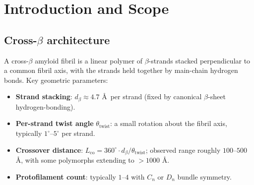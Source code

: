 \documentclass[12pt]{article}
\begin{document}
\begin{abstract}
\textbf{Empirical conjecture and falsifier.} The central prediction
(Conjecture~\ref{conj:C1}) is that observed cross-$\beta$ fibril
per-strand twists cluster on this 24-element admissible set
rather than distributing uniformly over $[3.4^{\circ}, 16.4^{\circ}]$.
Ultra-slow-twist polymorphs ($\theta < 3.4^{\circ}$, e.g.\ tau PHF
$\sim 1^{\circ}$) lie outside the current filter and are flagged
as an open regime (Remark~\ref{rem:R2}). The empirical test is
pending curation of a cryo-EM amyloid-twist dataset.

No empirical comparison is carried out in this paper; the
comparison pipeline follows the WO-1 capsid
template~\cite{SmartCapsid} with \texttt{wo2\_amyloid\_fetch.py}
and \texttt{wo2\_compare.py} planned in the same
\texttt{WAITING\_FOR\_DATA} style. Every claim is classified as
\textbf{derived}, \textbf{identified}, or \textbf{open}.
\end{abstract}

\section{Introduction and Scope}\label{sec:intro}

\subsection{Cross-$\beta$ architecture}

A cross-$\beta$ amyloid fibril is a linear polymer of
$\beta$-strands stacked perpendicular to a common fibril axis,
with the strands held together by main-chain hydrogen bonds. Key
geometric parameters:

\begin{itemize}
\item \textbf{Strand stacking}: $d_\beta \approx 4.7$ \AA\ per
  strand (fixed by canonical $\beta$-sheet hydrogen-bonding).
\item \textbf{Per-strand twist angle} $\theta_{\mathrm{twist}}$:
  a small rotation about the fibril axis, typically
  $1^{\circ}$--$5^{\circ}$ per strand.
\item \textbf{Crossover distance}:
  $L_{\mathrm{co}} = 360^{\circ} \cdot d_\beta / \theta_{\mathrm{twist}}$;
  observed range roughly $100$--$500$ \AA, with some polymorphs
  extending to $> 1000$ \AA.
\item \textbf{Protofilament count}: typically $1$--$4$ with
  $C_n$ or $D_n$ bundle symmetry.
\end{itemize}
\end{document}
